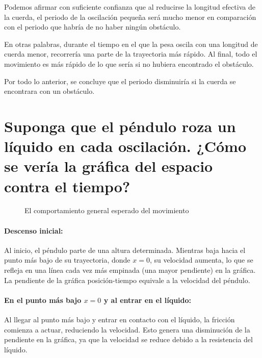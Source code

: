 \documentclass[letterpaper]{report}
\numberwithin{table}{section}
\begin{document}
Podemos afirmar con suficiente confianza que al reducirse la longitud
efectiva de la cuerda, el periodo de la oscilación pequeña será mucho
menor en comparación con el periodo que habría de no haber ningún obstáculo.

En otras palabras, durante el tiempo en el que la pesa oscila con
una longitud de cuerda menor, recorrería una parte de la trayectoria
más rápido. Al final, todo el movimiento es más rápido de lo que
sería si no hubiera encontrado el obstáculo.

Por todo lo anterior, se concluye que el periodo disminuiría si la
cuerda se encontrara con un obstáculo.

\section*{Suponga que el péndulo roza un líquido en cada
oscilación. ¿Cómo se vería la gráfica del espacio contra el tiempo?}

\begin{figure}[ht]
  \centering
  \caption{El comportamiento general esperado del
  movimiento}\label{fig:líquido}
\end{figure}

\paragraph{Descenso inicial:} Al inicio, el péndulo
parte de una altura determinada. Mientras baja hacia el punto más
bajo de su trayectoria, donde $x=0$, su velocidad aumenta, lo que se
refleja en una línea cada vez más empinada (una mayor pendiente)
en la gráfica. La pendiente de la gráfica posición-tiempo equivale a la
velocidad del péndulo.

\paragraph{En el punto más bajo $x=0$ y al entrar en el líquido:} Al llegar al
punto más bajo y entrar en contacto con el líquido, la fricción
comienza a actuar, reduciendo la velocidad. Esto genera una
disminución de la pendiente en la gráfica, ya que la velocidad se
reduce debido a la resistencia del líquido.
\end{document}
